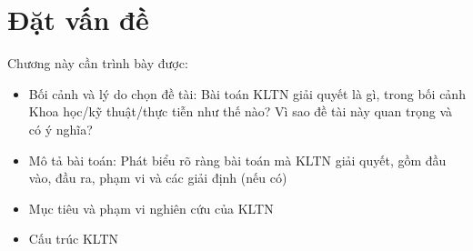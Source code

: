 \chapter{Đặt vấn đề}

Chương này cần trình bày được:
\begin{itemize}
    \item Bối cảnh và lý do chọn đề tài: Bài toán KLTN giải quyết là gì, trong bối cảnh Khoa học/kỹ thuật/thực tiễn như thế nào? Vì sao đề tài này quan trọng và có ý nghĩa?

    \item Mô tả bài toán: Phát biểu rõ ràng bài toán mà KLTN giải quyết, gồm đầu vào, đầu ra, phạm vi và các giải định (nếu có)

    \item Mục tiêu và phạm vi nghiên cứu của KLTN
    \item Cấu trúc KLTN
\end{itemize}
